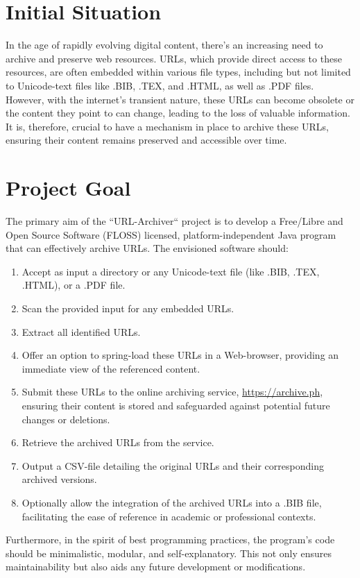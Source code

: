\section{Initial Situation}
In the age of rapidly evolving digital content, there's an increasing need to archive and preserve web resources. URLs, which provide direct access to these resources, are often embedded within various file types, including but not limited to Unicode-text files like .BIB, .TEX, and .HTML, as well as .PDF files. However, with the internet's transient nature, these URLs can become obsolete or the content they point to can change, leading to the loss of valuable information. It is, therefore, crucial to have a mechanism in place to archive these URLs, ensuring their content remains preserved and accessible over time.

\section{Project Goal}
The primary aim of the ``URL-Archiver`` project is to develop a Free/Libre and Open Source Software (FLOSS) licensed, platform-independent Java program that can effectively archive URLs. The envisioned software should:
\begin{enumerate}
    \item Accept as input a directory or any Unicode-text file (like .BIB, .TEX, .HTML), or a .PDF file.
    \item Scan the provided input for any embedded URLs.
    \item Extract all identified URLs.
    \item Offer an option to spring-load these URLs in a Web-browser, providing an immediate view of the referenced content.
    \item Submit these URLs to the online archiving service, \href{https://archive.ph}{https://archive.ph}, ensuring their content is stored and safeguarded against potential future changes or deletions.
    \item Retrieve the archived URLs from the service.
    \item Output a CSV-file detailing the original URLs and their corresponding archived versions.
    \item Optionally allow the integration of the archived URLs into a .BIB file, facilitating the ease of reference in academic or professional contexts.
\end{enumerate}
Furthermore, in the spirit of best programming practices, the program's code should be minimalistic, modular, and self-explanatory. This not only ensures maintainability but also aids any future development or modifications.

